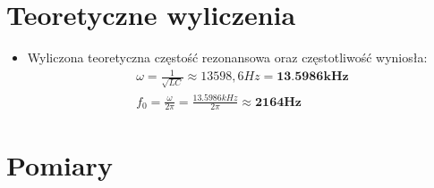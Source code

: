 \section{Teoretyczne wyliczenia}

\begin{itemize}
    \item Wyliczona teoretyczna częstość rezonansowa oraz częstotliwość wyniosła:
        \begin{gather}
            \omega = \frac{1}{\sqrt{LC}} \approx 13598,6Hz = \textbf{13.5986kHz} \\
            f_0 = \frac{\omega}{2\pi} = \frac{13.5986kHz}{2\pi} \approx \textbf{2164Hz}
        \end{gather}
\end{itemize}

\newpage

\section{Pomiary}

